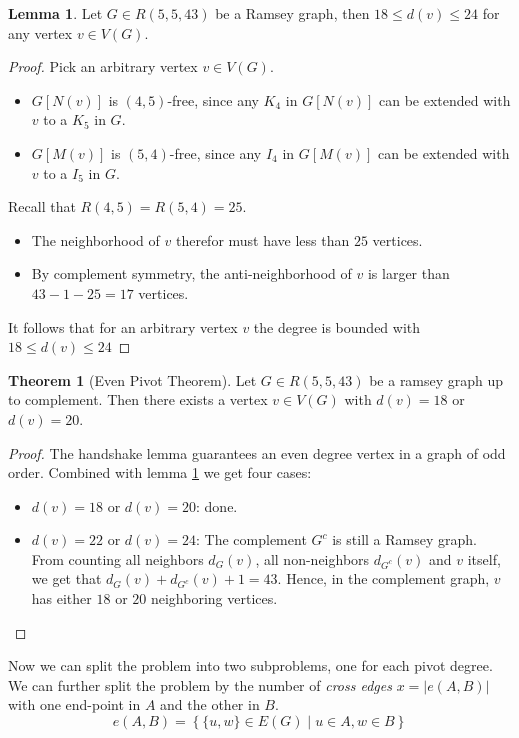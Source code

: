 \documentclass[a4paper]{article}
\theoremstyle{definition}
\newtheorem{lemma}{Lemma}
\newtheorem{theorem}{Theorem}
\begin{document}
\begin{lemma}\label{R_5_5_43_degree_mem}
	Let $G \in R(5,5,43)$ be a Ramsey graph,
	then $18 \leqslant d(v) \leqslant 24$ for any vertex $v \in V(G)$.
\end{lemma}
\begin{proof}
	Pick an arbitrary vertex $v \in V(G)$.
	\begin{itemize}
		\item $G[N(v)]$ is $(4, 5)$-free, since any $K_4$ in $G[N(v)]$ can be extended with $v$ to a $K_5$ in $G$.
		\item $G[M(v)]$ is $(5, 4)$-free, since any $I_4$ in $G[M(v)]$ can be extended with $v$ to a $I_5$ in $G$.
	\end{itemize}
	Recall that $R(4, 5) = R(5, 4) = 25$.
	\begin{itemize}
		\item The neighborhood of $v$ therefor must have less than $25$ vertices.
		\item By complement symmetry, the anti-neighborhood of $v$ is larger than $43 - 1 - 25 = 17$ vertices.
	\end{itemize}
	It follows that for an arbitrary vertex $v$ the degree is bounded with $18 \leqslant d(v) \leqslant 24$
\end{proof}

\begin{theorem}[Even Pivot Theorem]
	Let $G \in R(5,5,43)$ be a ramsey graph up to complement.
	Then there exists a vertex $v \in V(G)$ with $d(v) = 18$ or $d(v) = 20$.
\end{theorem}
\begin{proof}
	The handshake lemma guarantees an even degree vertex in a graph of odd order.
	Combined with lemma \ref{R_5_5_43_degree_mem} we get four cases:
	\begin{itemize}
		\item $d(v) = 18$ or $d(v) = 20$: done.
		\item $d(v) = 22$ or $d(v) = 24$: The complement $G^c$ is still a Ramsey graph.
		      From counting all neighbors $d_G(v)$, all non-neighbors $d_{G^c}(v)$ and $v$ itself,
		      we get that $d_G(v) + d_{G^c}(v) + 1 = 43$.
		      Hence, in the complement graph, $v$ has either $18$ or $20$ neighboring vertices.
	\end{itemize}
\end{proof}

Now we can split the problem into two subproblems, one for each pivot degree.
We can further split the problem by the number of \emph{cross edges} $x = |e(A, B)|$
with one end-point in $A$ and the other in $B$.
$$e(A, B) = \left\{ \{u,w\} \in E(G) \mid u \in A, w \in B \right\}$$
\end{document}
